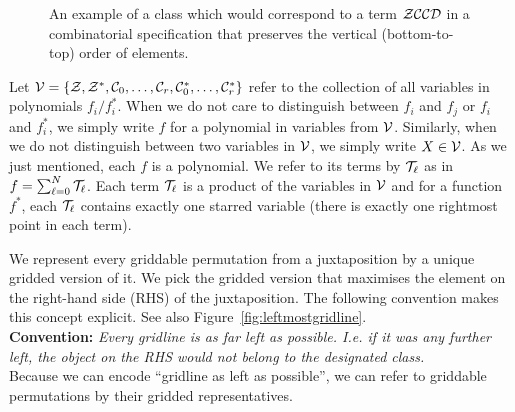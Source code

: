 \message{ !name(thesis.tex)}\documentclass[12pt, a4paper, twoside]{report}
\begin{document}
\begin{figure}[ht]
  \centering
  \caption{An example of a class which would correspond to a term $\mathcal{Z}\mathcal{C}\mathcal{C}\mathcal{D}$ in a combinatorial specification that preserves the vertical (bottom-to-top) order of elements.}
  \label{fig:order}
\end{figure}

Let $\mathcal{V} = \{\mathcal{Z},\mathcal{Z}^*,\mathcal{C}_0,\ldots,\mathcal{C}_r,\mathcal{C}^*_0,\ldots,\mathcal{C}_r^*\}$ refer to the collection of all variables in polynomials $f_i/f_i^*$. When we do not care to distinguish between $f_i$ and $f_j$ or $f_i$ and $f_i^*$, we simply write $f$ for a polynomial in variables from $\mathcal{V}$. Similarly, when we do not distinguish between two variables in $\mathcal{V}$, we simply write $X \in \mathcal{V}$. As we just mentioned, each $f$ is a polynomial. We refer to its terms by $\mathcal{T}_\ell$ as in $f = \sum_{\ell=0}^N\mathcal{T}_\ell$. Each term $\mathcal{T}_\ell$ is a product of the variables in $\mathcal{V}$ and for a function $f^*$, each $\mathcal{T}_\ell$ contains exactly one starred variable (there is exactly one rightmost point in each term). 

We represent every griddable permutation from a juxtaposition by a unique gridded version of it. We pick the gridded version that maximises the element on the right-hand side (RHS) of the juxtaposition. The following convention makes this concept explicit. See also Figure~\ref{fig:leftmostgridline}.\\

\noindent\textbf{Convention:} \emph{Every gridline is as far left as possible. I.e. if it was any further left, the object on the RHS would not belong to the designated class.}\\

\noindent Because we can encode ``gridline as left as possible'', we can refer to griddable permutations by their gridded representatives.
\end{document}
